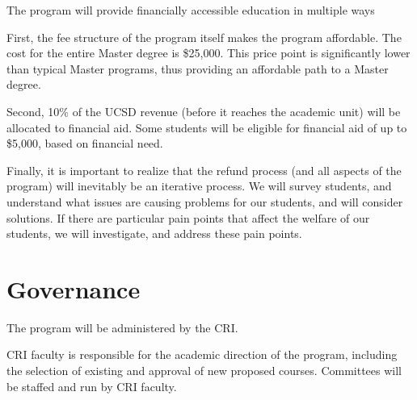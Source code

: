 \documentclass[11pt,letterpaper]{article}
\begin{document}
The program will provide financially accessible education in multiple ways 

First, the fee structure of the program itself makes the program
affordable. The cost for the entire Master degree is \$25,000. This
price point is significantly lower than typical Master programs, thus
providing an affordable path to a Master degree.

Second, 10\% of the UCSD revenue (before it reaches the academic unit)
will be allocated to financial aid. Some students will be eligible for
financial aid of up to \$5,000, based on financial need.

Finally, it is important to realize that the refund process (and all
aspects of the program) will inevitably be an iterative process. We
will survey students, and understand what issues are causing problems
for our students, and will consider solutions. If there are particular
pain points that affect the welfare of our students, we will
investigate, and address these pain points.

\section{Governance}

The program will be administered by the CRI.

CRI faculty is responsible for the academic direction of the program,
including the selection of existing and approval of new proposed
courses. Committees will be staffed and run by CRI faculty.
\end{document}
